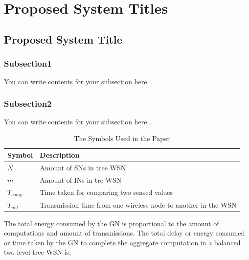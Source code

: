 \chapter{Proposed System Titles}
\ifpdf
    \graphicspath{{Chapter2/Chapter2Figs/PNG/}{Chapter2/Chapter2Figs/PDF/}{Chapter2/Chapter2Figs/}}
\else
    \graphicspath{{Chapter2/Chapter2Figs/EPS/}{Chapter2/Chapter2Figs/}}
\fi

\section{Proposed System Title}

\subsection{Subsection1}
You can write contents for your subsection here...

\subsection{Subsection2}

You can write contents for your subsection here...

\begin{table}[ht]
\caption{The Symbols Used in the Paper} %
\centering %
\begin{tabular}{l p{9cm}} %
\hline\hline %
Symbol & Description \\ [0.5ex] %
\hline %
$N$ & Amount of SNs in tree WSN \\ %
$m$ & Amount of INs in tre WSN \\
$T_{comp}$ & Time taken for comparing two sensed values \\
$T_{net}$ & Transmission time from one wireless node to another in the WSN \\
\hline %
\end{tabular}
\label{table:table1} %
\end{table}

The total energy consumed by the GN is proportional to the amount of computations and amount of transmissions. The total delay or energy consumed or time taken by the GN to complete the aggregate computation in a balanced two level tree WSN is,

